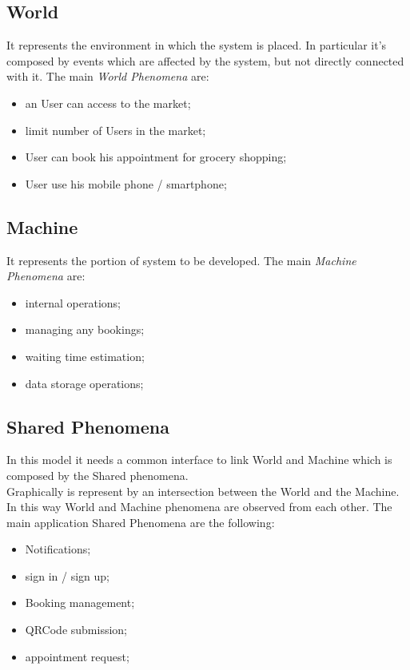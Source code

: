 \subsection{World}

It represents the environment in which the system is placed. In particular it's composed by events which are affected by the system, but not directly connected with it.
The main \textit{World Phenomena} are:

\begin{itemize}
\item an User can access to the market;
\item limit number of Users in the market;
\item User can book his appointment for grocery shopping;
\item User use his mobile phone / smartphone;
\end{itemize}


\subsection{Machine}
It represents the portion of system to be developed.
The main \textit{Machine Phenomena} are:
\begin{itemize}
\item internal operations;
\item managing any bookings;
\item waiting time estimation;
\item data storage operations;
\end{itemize}
\subsection{Shared Phenomena} 
In this model it needs a common interface to link World and Machine which is composed by the Shared phenomena. \\
Graphically is represent by an intersection between the World and the Machine. In this way World and Machine phenomena are observed from each other.  
The main application Shared Phenomena are the following:
\begin{itemize}
\item Notifications;
\item sign in / sign up;
\item Booking management;
\item QRCode submission;
\item appointment request;
\end{itemize}

